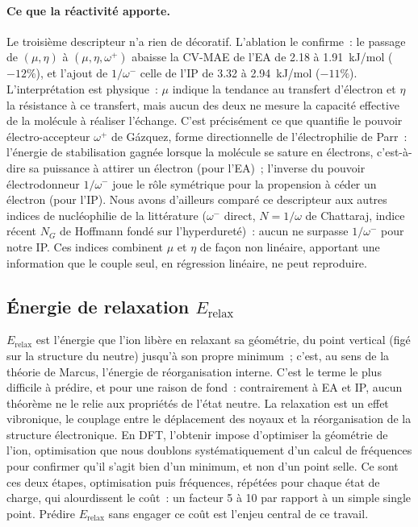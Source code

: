 \paragraph{Ce que la réactivité apporte.}
Le troisième descripteur n'a rien de décoratif. L'ablation le confirme~: le passage de $(\mu, \eta)$ à $(\mu, \eta, \omega^+)$ abaisse la CV-MAE de l'EA de \SI{2.18}{} à \SI{1.91}{kJ/mol} ($-12\%$), et l'ajout de $1/\omega^-$ celle de l'IP de \SI{3.32}{} à \SI{2.94}{kJ/mol} ($-11\%$). L'interprétation est physique~: $\mu$ indique la tendance au transfert d'électron et $\eta$ la résistance à ce transfert, mais aucun des deux ne mesure la capacité effective de la molécule à réaliser l'échange. C'est précisément ce que quantifie le pouvoir électro-accepteur $\omega^+$ de Gázquez, forme directionnelle de l'électrophilie de Parr\cite{parr1999}~: l'énergie de stabilisation gagnée lorsque la molécule se sature en électrons, c'est-à-dire sa puissance à attirer un électron (pour l'EA)~; l'inverse du pouvoir électrodonneur $1/\omega^-$ joue le rôle symétrique pour la propension à céder un électron (pour l'IP). Nous avons d'ailleurs comparé ce descripteur aux autres indices de nucléophilie de la littérature ($\omega^-$ direct, $N = 1/\omega$ de Chattaraj, indice récent $N_G$ de Hoffmann fondé sur l'hyperdureté\cite{hoffmann2024})~: aucun ne surpasse $1/\omega^-$ pour notre IP. Ces indices combinent $\mu$ et $\eta$ de façon non linéaire, apportant une information que le couple seul, en régression linéaire, ne peut reproduire.


\subsection{Énergie de relaxation $E_{\text{relax}}$}
\label{sec:Erelax}

$E_{\text{relax}}$ est l'énergie que l'ion libère en relaxant sa géométrie, du point vertical (figé sur la structure du neutre) jusqu'à son propre minimum~; c'est, au sens de la théorie de Marcus, l'énergie de réorganisation interne\cite{marcus1956}. C'est le terme le plus difficile à prédire, et pour une raison de fond~: contrairement à EA et IP, aucun théorème ne le relie aux propriétés de l'état neutre. La relaxation est un effet vibronique, le couplage entre le déplacement des noyaux et la réorganisation de la structure électronique. En DFT, l'obtenir impose d'optimiser la géométrie de l'ion, optimisation que nous doublons systématiquement d'un calcul de fréquences pour confirmer qu'il s'agit bien d'un minimum, et non d'un point selle. Ce sont ces deux étapes, optimisation puis fréquences, répétées pour chaque état de charge, qui alourdissent le coût~: un facteur 5 à 10 par rapport à un simple single point. Prédire $E_{\text{relax}}$ sans engager ce coût est l'enjeu central de ce travail.

